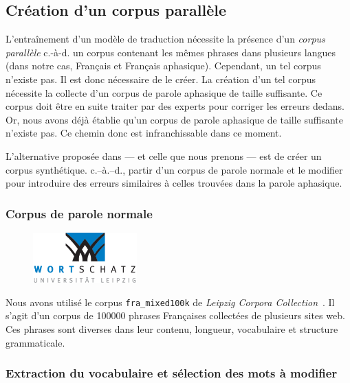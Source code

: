 \subsection{Création d'un corpus parallèle}

L'entraînement d'un modèle de traduction nécessite la présence d'un \emph{corpus parallèle}
c.-à-d. un corpus contenant les mêmes phrases dans plusieurs langues (dans notre cas, Français et Français aphasique).
Cependant, un tel corpus n'existe pas. 
Il est donc nécessaire de le créer.
La création d'un tel corpus nécessite la collecte d'un corpus de parole aphasique de taille suffisante.
Ce corpus doit être en suite traiter par des experts pour corriger les erreurs dedans.
Or, nous avons déjà établie qu'un corpus de parole aphasique de taille suffisante n'existe pas.
Ce chemin donc est infranchissable dans ce moment.

L'alternative proposée dans \cite{Smaili_Langlois_Pribil_2022} --- et celle que nous prenons --- 
est de créer un corpus synthétique.
c.--à.--d., partir d'un corpus de parole normale et le modifier pour introduire 
des erreurs similaires à celles trouvées dans la parole aphasique.

\subsubsection{Corpus de parole normale}

\begin{figure}
    \centering
    \includegraphics[width=4cm]{assets/images/ws.png}
\end{figure}

Nous avons utilisé le corpus \texttt{fra\_mixed100k} de 
\emph{\foreignlanguage{english}{Leipzig Corpora Collection}}~\cite{Goldhahn_Eckart_Quasthoff}.
Il s'agit d'un corpus de 100000 phrases Françaises collectées de plusieurs sites web.
Ces phrases sont diverses dans leur contenu, longueur, vocabulaire et structure grammaticale.

\subsubsection{Extraction du vocabulaire et sélection des mots à modifier}

